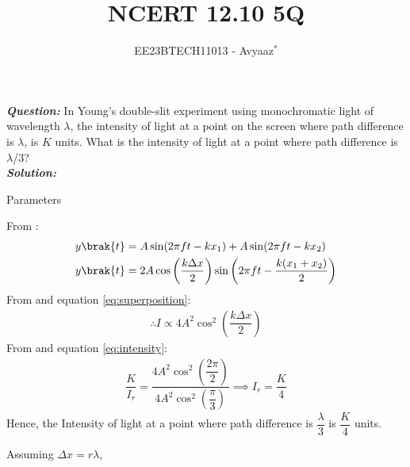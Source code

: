 \documentclass[journal,12pt,twocolumn]{IEEEtran}
\theoremstyle{remark}
\begin{document}

\vspace{3cm}

\title{NCERT 12.10 5Q}
\author{EE23BTECH11013 - Avyaaz$^{*}$%
}
\maketitle
\newpage
\bigskip

\renewcommand{\thefigure}{\arabic{figure}}
\renewcommand{\thetable}{\arabic{table}}

\large\textbf{\textsl{Question:}}
In Young’s double-slit experiment using monochromatic light of wavelength $\lambda$, the intensity of light at a point on the screen where path difference is $\lambda$, is $K$ units. What is the intensity of light at a
point where path difference is $\lambda$/3?\\
\large\textbf{\textsl{Solution:}}
\fi
\begin{table}[htbp]
\setlength{\extrarowheight}{8pt}
\centering

\caption{Parameters}
\label{tab:parameters}
\end{table}

From :
\begin{align}
y\brak{t} &= A\sin({2\pi f t - kx_1})  + A\sin({ 2\pi f t - kx_2}) \\
y\brak{t} &=  2A\cos\left(\dfrac{k\Delta x}{2}\right)\sin\left(2\pi f t - \dfrac{k(x_1+x_2)}{2} \right) \label{eq:superposition}
\end{align}
From  and equation \eqref{eq:superposition}: 
\begin{align}
\therefore I \propto 4A^2\cos^2\left(\dfrac{k\Delta x}{2}\right)  \label{eq:intensity}
\end{align}
From  and equation \eqref{eq:intensity}: 
\begin{align}
 \dfrac{K}{I_r} = \dfrac{4A^2\cos^2\left(\dfrac{2\pi}{2}\right)}{4A^2\cos^2\left(\dfrac{\pi}{3}\right)}
 \implies I_r = \dfrac{K}{4}
 \end{align}
 Hence, the Intensity of light at a point where path difference is $\dfrac{\lambda}{3}$ is $\dfrac{K}{4}$ units.

\begin{table}[htbp]
\centering

\caption{}
\label{tab:intensity}
\end{table}
Assuming $\Delta x= r\lambda$, 
\end{document}
